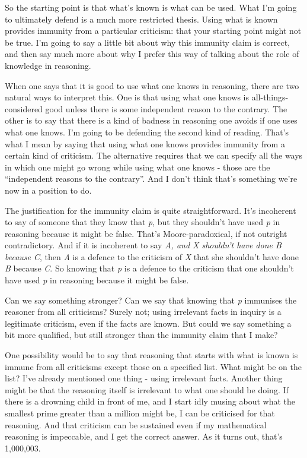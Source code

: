 \documentclass[
  12pt,
  letterpaper,
]{scrbook}
\begin{document}
So the starting point is that what's known is what can be used. What I'm
going to ultimately defend is a much more restricted thesis. Using what
is known provides immunity from a particular criticism: that your
starting point might not be true. I'm going to say a little bit about
why this immunity claim is correct, and then say much more about why I
prefer this way of talking about the role of knowledge in reasoning.

When one says that it is good to use what one knows in reasoning, there
are two natural ways to interpret this. One is that using what one knows
is all-things-considered good unless there is some independent reason to
the contrary. The other is to say that there is a kind of badness in
reasoning one avoids if one uses what one knows. I'm going to be
defending the second kind of reading. That's what I mean by saying that
using what one knows provides immunity from a certain kind of criticism.
The alternative requires that we can specify all the ways in which one
might go wrong while using what one knows - those are the ``independent
reasons to the contrary''. And I don't think that's something we're now
in a position to do.

The justification for the immunity claim is quite straightforward. It's
incoherent to say of someone that they know that \emph{p}, but they
shouldn't have used \emph{p} in reasoning because it might be false.
That's Moore-paradoxical, if not outright contradictory. And if it is
incoherent to say \emph{A, and X shouldn't have done B because C}, then
\emph{A} is a defence to the criticism of \emph{X} that she shouldn't
have done \emph{B} because \emph{C}. So knowing that \emph{p} is a
defence to the criticism that one shouldn't have used \emph{p} in
reasoning because it might be false.

Can we say something stronger? Can we say that knowing that \emph{p}
immunises the reasoner from all criticisms? Surely not; using irrelevant
facts in inquiry is a legitimate criticism, even if the facts are known.
But could we say something a bit more qualified, but still stronger than
the immunity claim that I make?

One possibility would be to say that reasoning that starts with what is
known is immune from all criticisms except those on a specified list.
What might be on the list? I've already mentioned one thing - using
irrelevant facts. Another thing might be that the reasoning itself is
irrelevant to what one should be doing. If there is a drowning child in
front of me, and I start idly musing about what the smallest prime
greater than a million might be, I can be criticised for that reasoning.
And that criticism can be sustained even if my mathematical reasoning is
impeccable, and I get the correct answer. As it turns out, that's
1,000,003.
\end{document}

